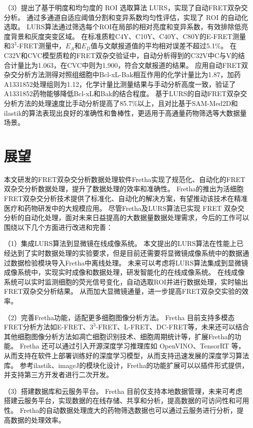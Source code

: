 （3）提出了基于明度和均匀度的 ROI 选取算法 LURS，实现了自动FRET双杂交分析。
通过多通道自适应阈值分割和变异系数均匀性评估，实现了 ROI 的自动化选取。
LURS算法通过筛选每个ROI在局部的相对亮度和变异系数，有效排除低亮度背景和灰度突变区域。
在标准质粒C4Y、C10Y、C40Y、C80Y的E-FRET测量和$3^3$-FRET测量中，$E_{A}$和$E_{D}$值与文献报道值的平均相对误差不超过5.1\%。
在C32V和CVC模型质粒的FRET双杂交验证中，自动分析得到的C32V中C与V的结合计量比为1.063，在CVC中则为1.900，符合文献报道的结果。
应用自动FRET双杂交分析方法测得对照组细胞中Bcl-xL-Bak相互作用的化学计量比为1.87，加药A1331852处理组则为1.12，化学计量比测量结果与手动分析高度一致，验证了A1331852药物能够降低Bcl-xL和Bak的结合程度。
基于LURS的自动FRET双杂交分析方法的处理速度比手动分析提高了85.7\%以上，且对比基于SAM-Med2D和ilastik的算法表现出良好的准确性和鲁棒性，更适用于高通量药物筛选等大数据量场景。

\section{展望}
本文研发的FRET双杂交分析数据处理软件Fretha实现了规范化、自动化的FRET双杂交分析数据处理，提升了数据处理的效率和准确性。
Fretha的推出为活细胞FRET双杂交分析技术提供了标准化、自动化的解决方案，有望推动该技术在精准医疗和药物研发中的大规模应用。
尽管Fretha及LURS算法已实现 FRET 双杂交分析的自动化处理，面对未来日益提高的大数据量数据处理需求，今后的工作可以围绕以下几个方面进行改进和完善：

（1）集成LURS算法到显微镜在线成像系统。
本文提出的LURS算法在性能上已经达到了实时数据处理的实验要求，但是目前还需要将显微镜成像系统中的数据通过数据检验模块导入Fretha中离线处理。
未来可以考虑将LURS算法集成到显微镜成像系统中，实现实时成像和数据处理，研发智能化的在线成像系统。
在线成像系统可以实时监测细胞的荧光信号变化，自动选取ROI并进行数据处理，实时输出FRET双杂交分析结果。
从而加大显微镜通量，进一步提高FRET双杂交实验的效率。

（2）完善Fretha功能，适配更多细胞图像分析方法。
Fretha 目前支持多模态FRET分析方法如E-FRET、$3^3$-FRET、L-FRET、DC-FRET等，未来还可以结合其他细胞图像分析方法如凋亡细胞识别技术、细胞周期统计等，扩展Fretha的功能。
Fretha 还可以通过引入开源深度学习推理库如 OpenVINO、TensorRT 等，从而支持在软件上部署训练好的深度学习模型，从而支持迅速发展的深度学习算法库。
参考ilastik、imageJ的模块化设计，Fretha的功能扩展可以以插件形式提供，并支持第三方开发者进行二次开发。

（3）搭建数据库和云服务平台。
Fretha 目前仅支持本地数据管理，未来可考虑搭建云服务平台，实现数据的在线存储、共享和分析，提高数据的可访问性和可用性。
Fretha的自动数据处理庞大的药物筛选数据也可以通过云服务进行分析，提高数据的处理效率。